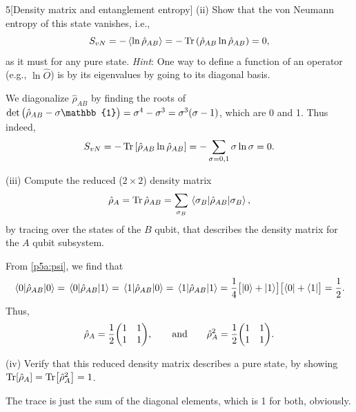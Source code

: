 \documentclass[12pt]{article}
\begin{document}
\begin{problem}{5}[Density matrix and entanglement entropy]
\qquad(ii) Show that the von Neumann entropy of this state vanishes, i.e.,
\begin{equation}
    S_{vN}=-\expval{\ln\hat\rho_{AB}}=-\Tr\qty(\hat\rho_{AB}\ln\hat\rho_{AB})=0, 
\end{equation}
as it must for any pure state. \textit{Hint}: One way to define a function of an
operator (e.g., $\ln\hat{O}$) is by its eigenvalues by going to its diagonal
basis.
\begin{solution}
We diagonalize $\hat\rho_{AB}$ by finding the roots of
$\det\mqty(\hat\rho_{AB}-\sigma\mathbb{1})=\sigma^4-\sigma^3=\sigma^3\qty(\sigma-1)$,
which are 0 and 1. Thus indeed,
\begin{equation}
    S_{vN}=-\Tr\qty[\hat\rho_{AB}\ln\hat\rho_{AB}]
    =-\sum_{\sigma=0,1}\sigma\ln\sigma=0.
\end{equation}
\end{solution}

\qquad(iii) Compute the reduced ($2\times2$) density matrix
\begin{equation}
    \hat\rho_A=\Tr\hat\rho_{AB}=\sum_{\sigma_B}\ev{\hat\rho_{AB}}{\sigma_B},
\end{equation}
by tracing over the states of the $B$ qubit, that describes the density matrix
for the $A$ qubit subsystem.
\begin{solution}
From \eqref{p5a:psi}, we find that
\begin{equation}
    \mel{0}{\hat\rho_{AB}}{0}
    =\mel{0}{\hat\rho_{AB}}{1}
    =\mel{1}{\hat\rho_{AB}}{0}
    =\mel{1}{\hat\rho_{AB}}{1}
    =\frac14\qty[\ket{0}+\ket{1}]\qty[\bra{0}+\bra{1}]
    =\frac12.
\end{equation}
Thus,
\begin{equation}
    \hat\rho_A=\frac12\mqty(1&1\\1&1),\qquad\t{and}\qquad
    \hat\rho_A^2=\frac12\mqty(1&1\\1&1).
\end{equation}
\end{solution}

\qquad(iv) Verify that this reduced density matrix describes a pure state, by
showing $\Tr[\hat\rho_A]=\Tr[\hat\rho_A^2]=1$.
\begin{solution}
The trace is just the sum of the diagonal elements, which is 1 for both,
obviously. 
\end{solution}


\end{problem}
\end{document}
